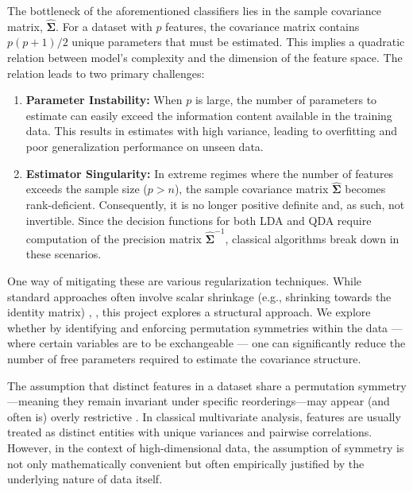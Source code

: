 The bottleneck of the aforementioned classifiers lies in the sample covariance matrix, \(\hat{\boldsymbol{\Sigma}}\).
For a dataset with \(p\) features, the covariance matrix contains \(p(p+1)/2\) unique parameters that must be estimated.
This implies a quadratic relation between model's complexity and the dimension of the feature space.
The relation leads to two primary challenges:

\begin{enumerate}
\def\labelenumi{\arabic{enumi}.}
\tightlist
\item
  \textbf{Parameter Instability:} When \(p\) is large, the number of parameters to estimate can easily exceed the information content available in the training data. This results in estimates with high variance, leading to overfitting and poor generalization performance on unseen data.
\item
  \textbf{Estimator Singularity:} In extreme regimes where the number of features exceeds the sample size (\(p > n\)), the sample covariance matrix \(\hat{\boldsymbol{\Sigma}}\) becomes rank-deficient. Consequently, it is no longer positive definite and, as such, not invertible. Since the decision functions for both LDA and QDA require computation of the precision matrix \(\hat{\boldsymbol{\Sigma}}^{-1}\), classical algorithms break down in these scenarios.
\end{enumerate}

One way of mitigating these are various regularization techniques.
While standard approaches often involve scalar shrinkage (e.g., shrinking towards the identity matrix) \citep{friedman1989regularized}, \citep{ledoit2004well}, this project explores a structural approach.
We explore whether by identifying and enforcing permutation symmetries within the data --- where certain variables are to be exchangeable --- one can significantly reduce the number of free parameters required to estimate the covariance structure.

The assumption that distinct features in a dataset share a permutation symmetry---meaning they remain invariant under specific reorderings---may appear (and often is) overly restrictive \citep{andersson1998symmetry}. In classical multivariate analysis, features are usually treated as distinct entities with unique variances and pairwise correlations. However, in the context of high-dimensional data, the assumption of symmetry is not only mathematically convenient but often empirically justified by the underlying nature of data itself.

